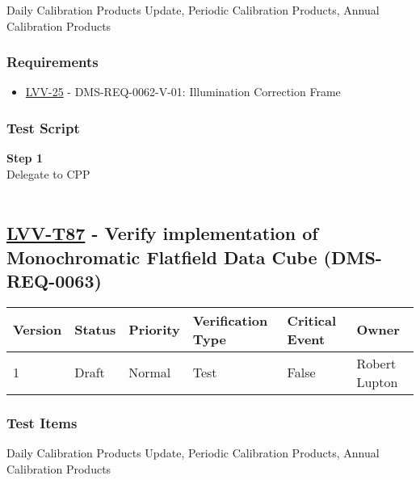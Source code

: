 Daily Calibration Products Update, Periodic Calibration Products, Annual
Calibration Products

\hypertarget{requirements-63}{%
\subsubsection{Requirements}\label{requirements-63}}

\begin{itemize}
\tightlist
\item
  \href{https://jira.lsstcorp.org/browse/LVV-25}{LVV-25} -
  DMS-REQ-0062-V-01: Illumination Correction Frame
\end{itemize}

\hypertarget{test-script-63}{%
\subsubsection{Test Script}\label{test-script-63}}

\textbf{Step 1}\\
Delegate to CPP\\
~\\

\hypertarget{lvv-t87---verify-implementation-of-monochromatic-flatfield-data-cube-dms-req-0063}{%
\subsection{\texorpdfstring{\href{https://jira.lsstcorp.org/secure/Tests.jspa\#/testCase/LVV-T87}{LVV-T87}
- Verify implementation of Monochromatic Flatfield Data Cube
(DMS-REQ-0063)}{LVV-T87 - Verify implementation of Monochromatic Flatfield Data Cube (DMS-REQ-0063)}}\label{lvv-t87---verify-implementation-of-monochromatic-flatfield-data-cube-dms-req-0063}}

\begin{longtable}[]{@{}llllll@{}}
\toprule
Version & Status & Priority & Verification Type & Critical Event &
Owner\tabularnewline
\midrule
\endhead
1 & Draft & Normal & Test & False & Robert Lupton\tabularnewline
\bottomrule
\end{longtable}

\hypertarget{test-items-63}{%
\subsubsection{Test Items}\label{test-items-63}}

Daily Calibration Products Update, Periodic Calibration Products, Annual
Calibration Products

